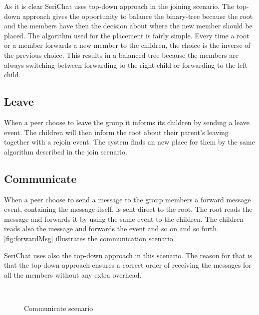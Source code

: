 As it is clear SeriChat uses top-down approach in the joining scenario. The top-down approach gives the opportunity to balance the binary-tree because the root and the members have then the decision about where the new member should be placed. The algorithm used for the placement is fairly simple. Every time a root or a member forwards a new member to the children, the choice is the inverse of the previous choice. This results in a balanced tree because the members are always switching between forwarding to the right-child or forwarding to the left-child.

\subsection{Leave}
When a peer choose to leave the group it informs its children by sending a leave event. The children will then inform the root about their parent's leaving together with a rejoin event. The system finds an new place for them by the same algorithm described in the join scenario.



\subsection{Communicate}
When a peer choose to send a message to the group members a forward message event, containing the message itself,  is sent direct to the root. The root reads the message and forwards it by using the same event to the children. The children reads also the message and forwards the event and so on and so forth.
\autoref{fig:forwardMsg} illustrates the communication scenario.

SeriChat uses also the top-down approach in this scenario. The reason for that is that the top-down approach ensures a correct order of receiving the messages for all the members without any extra overhead.

\begin{figure}[bth]
	\myfloatalign
	 \quad
	 \\
	\caption{Communicate scenario}\label{fig:forwardMsg}
\end{figure}

